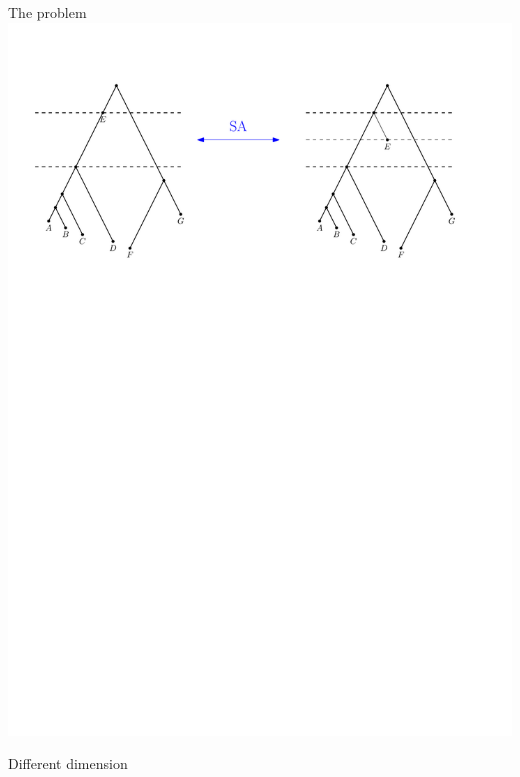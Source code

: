 \documentclass{beamer}
\theoremstyle{example}
\begin{document}
\begin{frame}
\begin{block}{The problem}
\includegraphics[width=\framewidth]{SAT_dimension}

\centering
Different dimension
\end{block}
\end{frame}
\end{document}

